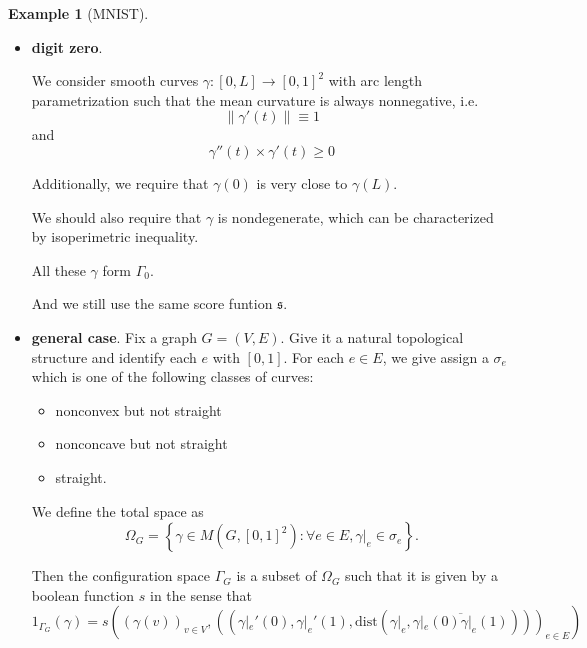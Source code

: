 \documentclass[11pt, oneside]{article}   	%
\theoremstyle{definition}
\newtheorem*{example}{Example}
\begin{document}
\begin{example}[MNIST]
\begin{itemize}
[an image here]

Here we consider all continuous $\gamma:[0,2]\to [0,1]^2$ such that $\gamma|_{[0,1]}, \gamma|_{[1,2]}$ are straight line segments. Additionally, there should be some constraint on the positions of $\gamma(0), \gamma(1), \gamma(2)$ such that $\overline{\gamma(0)\gamma(1)}$ is very close to being horizontal, and $\overline{\gamma(1)\gamma(2)}$ should be roughly vertical downward.

The score function $\mathfrak{s}$ is the same.

The dimensionality of the configuration space is 6, which can actually be reduced to 5.

\item \textbf{digit zero}.

We consider smooth curves $\gamma:[0,L]\to [0,1]^2$ with arc length parametrization such that the mean curvature is always nonnegative, i.e.
\begin{equation}
	\|\gamma'(t)\|\equiv 1
\end{equation}
and
\begin{equation}
	\gamma''(t)\times \gamma'(t) \ge 0
\end{equation}

Additionally, we require that $\gamma(0)$ is very close to $\gamma(L)$.

We should also require that $\gamma$ is nondegenerate, which can be characterized by isoperimetric inequality.

All these $\gamma$ form $\Gamma_0$.

And we still use the same score funtion $\mathfrak{s}$.

\item \textbf{general case}. Fix a graph $G=(V,E)$. Give it a natural topological structure and identify each $e$ with $[0,1]$. For each $e\in E$, we give assign a $\sigma_e$ which is one of the following classes of curves:

\begin{itemize}
	\item nonconvex but not straight
	\item nonconcave but not straight
	\item straight.
\end{itemize}

We define the total space as
\begin{equation}
	\Omega_G = \left\{\gamma\in M(G, [0,1]^2): \forall e\in E, \gamma|_e\in \sigma_e\right\}.
\end{equation}

Then the configuration space $\Gamma_G$ is a subset of $\Omega_G$ such that it is given by a boolean function $s$ in the sense that
\begin{equation}
	1_{\Gamma_G}(\gamma)=s((\gamma(v))_{v\in V},((\gamma|_e'(0), \gamma|_e'(1), \text{dist}(\gamma|_e,\overline{\gamma|_e(0)\gamma|_e(1)})))_{e\in E})
\end{equation}
\end{itemize}
\end{example}
\end{document}
